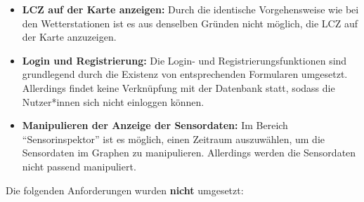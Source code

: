 \begin{itemize}
    \item \textbf{\ac{LCZ} auf der Karte anzeigen:} Durch die identische Vorgehensweise wie bei den Wetterstationen ist es aus denselben Gründen nicht möglich, die \ac{LCZ} auf der Karte anzuzeigen.
    \item \textbf{Login und Registrierung:} Die Login- und Registrierungsfunktionen sind grundlegend durch die Existenz von entsprechenden Formularen umgesetzt. Allerdings findet keine Verknüpfung mit der Datenbank statt, sodass die Nutzer*innen sich nicht einloggen können.
    \item \textbf{Manipulieren der Anzeige der Sensordaten:} Im Bereich \enquote{Sensorinspektor} ist es möglich, einen Zeitraum auszuwählen, um die Sensordaten im Graphen zu manipulieren. Allerdings werden die Sensordaten nicht passend manipuliert.
\end{itemize}

Die folgenden Anforderungen wurden \textbf{nicht} umgesetzt:

